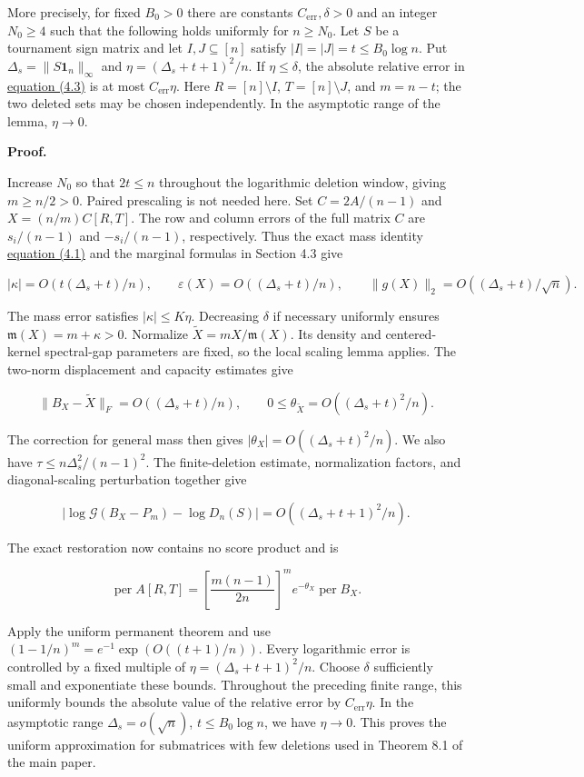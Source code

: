 \documentclass[11pt,a4paper]{article}
\begin{document}
More precisely, for fixed \(B_0>0\) there are constants \(C_{\mathrm{err}},\delta>0\) and an integer \(N_0\ge4\) such that the following holds uniformly for \(n\ge N_0\). Let \(S\) be a tournament sign matrix and let \(I,J\subseteq[n]\) satisfy \(|I|=|J|=t\le B_0\log n\). Put \(\Delta_s=\|S\mathbf1_n\|_\infty\) and \(\eta=(\Delta_s+t+1)^2/n\). If \(\eta\le\delta\), the absolute relative error in \hyperref[eq-small-score-permanent]{equation (4.3)} is at most \(C_{\mathrm{err}}\eta\). Here \(R=[n]\setminus I\), \(T=[n]\setminus J\), and \(m=n-t\); the two deleted sets may be chosen independently. In the asymptotic range of the lemma, \(\eta\to0\).

\textbf{Proof.}

Increase \(N_0\) so that \(2t\le n\) throughout the logarithmic deletion window, giving \(m\ge n/2>0\). Paired prescaling is not needed here. Set \(C=2A/(n-1)\) and \(X=(n/m)C[R,T]\). The row and column errors of the full matrix \(C\) are \(s_i/(n-1)\) and \(-s_i/(n-1)\), respectively. Thus the exact mass identity \hyperref[eq-deletion-mass]{equation (4.1)} and the marginal formulas in Section 4.3 give

\[
|\kappa|=O(t(\Delta_s+t)/n),\qquad \varepsilon(X)=O((\Delta_s+t)/n),\qquad \|g(X)\|_2=O((\Delta_s+t)/\sqrt n).
\]

The mass error satisfies \(|\kappa|\le K\eta\). Decreasing \(\delta\) if necessary uniformly ensures \(\mathfrak m(X)=m+\kappa>0\). Normalize \(\widetilde X=mX/\mathfrak m(X)\). Its density and centered-kernel spectral-gap parameters are fixed, so the local scaling lemma applies. The two-norm displacement and capacity estimates give

\[
\|B_X-\widetilde X\|_F=O((\Delta_s+t)/n),\qquad 0\le\theta_{\widetilde X}=O((\Delta_s+t)^2/n).
\]

The correction for general mass then gives \(|\theta_X|=O((\Delta_s+t)^2/n)\). We also have \(\tau\le n\Delta_s^2/(n-1)^2\). The finite-deletion estimate, normalization factors, and diagonal-scaling perturbation together give

\[
|\log\mathcal G(B_X-P_m)-\log D_n(S)|=O((\Delta_s+t+1)^2/n).
\]

The exact restoration now contains no score product and is

\[
\operatorname{per}A[R,T]=\left[\frac{m(n-1)}{2n}\right]^m e^{-\theta_X}\operatorname{per}B_X.
\]

Apply the uniform permanent theorem and use \((1-1/n)^m=e^{-1}\exp(O((t+1)/n))\). Every logarithmic error is controlled by a fixed multiple of \(\eta=(\Delta_s+t+1)^2/n\). Choose \(\delta\) sufficiently small and exponentiate these bounds. Throughout the preceding finite range, this uniformly bounds the absolute value of the relative error by \(C_{\mathrm{err}}\eta\). In the asymptotic range \(\Delta_s=o(\sqrt n)\), \(t\le B_0\log n\), we have \(\eta\to0\). This proves the uniform approximation for submatrices with few deletions used in Theorem 8.1 of the main paper.
\end{document}
